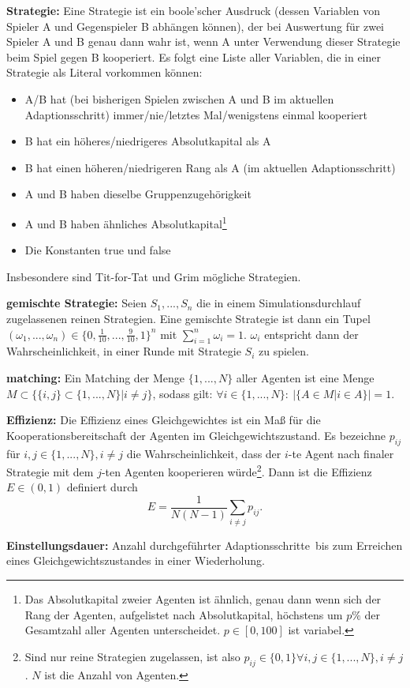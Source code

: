 \documentclass[parskip=full,11pt]{scrartcl}
\def\adapt{Adaptionsschritt}
\def\adapts{Adaptionsschritte}
\begin{document}
\textbf{\Gls{Strategie}:}
Eine Strategie ist ein boole'scher Ausdruck (dessen Variablen von Spieler A und Gegenspieler B abhängen können), der bei Auswertung für zwei Spieler A und B genau dann wahr ist, wenn A unter Verwendung dieser Strategie beim Spiel gegen B kooperiert. Es folgt eine Liste aller Variablen, die in einer Strategie als Literal vorkommen können:
\begin{itemize}
\item A/B hat (bei bisherigen Spielen zwischen A und B im aktuellen \adapt) immer/nie/letztes Mal/wenigstens einmal kooperiert
\item B hat ein höheres/niedrigeres Absolutkapital als A
\item B hat einen höheren/niedrigeren Rang als A (im aktuellen \adapt)
\item A und B haben dieselbe Gruppenzugehörigkeit
\item A und B haben ähnliches Absolutkapital\footnote{Das Absolutkapital zweier Agenten ist ähnlich, genau dann wenn sich der Rang der Agenten, aufgelistet nach Absolutkapital, höchstens um \(p\%\) der Gesamtzahl aller Agenten unterscheidet. \(p \in [0,100]\) ist variabel.}
\item Die Konstanten true und false
\end{itemize}
Insbesondere sind Tit-for-Tat und Grim mögliche Strategien.

\textbf{\Gls{gemischte Strategie}:}
Seien \(S_1,...,S_n\) die in einem Simulationsdurchlauf zugelassenen reinen Strategien. Eine gemischte Strategie ist dann ein Tupel \((\omega_1,...,\omega_n) \in \{0,\frac{1}{10},...,\frac{9}{10},1\}^n\) mit \(\sum_{i=1}^n \omega_i = 1\). \(\omega_i\) entspricht dann der Wahrscheinlichkeit, in einer Runde mit Strategie \(S_i\) zu spielen.

\textbf{\Gls{matching}:}
Ein Matching der Menge \(\{1,...,N\}\) aller Agenten ist eine Menge \(M \subset \{\{i,j\} \subset \{1,...,N\} | i \neq j\}\), sodass gilt: \(\forall i \in \{1,...,N\}: \ |\{A \in M | i \in A\}| = 1\).

\textbf{\Gls{Effizienz}:}
Die Effizienz eines Gleichgewichtes ist ein Maß für die Kooperationsbereitschaft der Agenten im Gleichgewichtszustand. Es bezeichne \(p_{ij}\) für \(i,j \in \{1,...,N\}, i \neq j\) die Wahrscheinlichkeit, dass der \(i\)-te Agent nach finaler Strategie mit dem \(j\)-ten Agenten kooperieren würde\footnote{Sind nur reine Strategien zugelassen, ist also \(p_{ij} \in \{0,1\} \forall i,j \in \{1,...,N\}, i \neq j\). \(N\) ist die Anzahl von Agenten.}. Dann ist die Effizienz \(E \in (0,1)\) definiert durch
\[
E = \frac{1}{N(N - 1)} \sum_{i \neq j} p_{ij}.
\]

\textbf{\Gls{Einstellungsdauer}:}
Anzahl durchgeführter \adapts\ bis zum Erreichen eines Gleichgewichtszustandes in einer Wiederholung.
\end{document}
